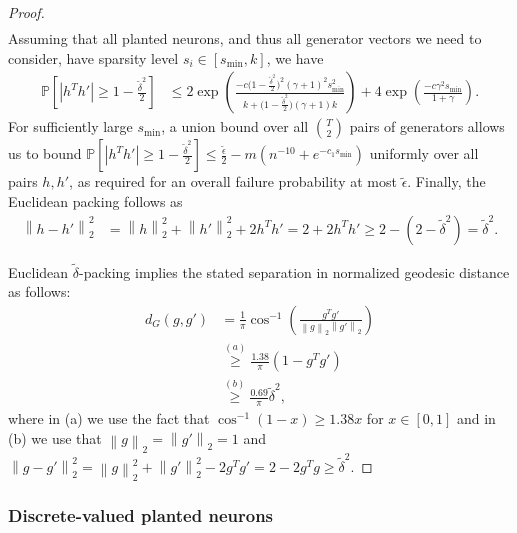 \documentclass{article} %
\newcommand{\twonorm}[1]{\left\|#1\right\|_{2}}
\newcommand{\Prob}{\ensuremath{{\mathbb{P}}}}
\newcommand{\1}{\ensuremath{{\sf (i)}}}
\newcommand{\2}{\ensuremath{{\sf (ii)}}}
\newcommand{\3}{\ensuremath{{\sf (iii)}}}
\newcommand{\4}{\ensuremath{{\sf (iv)}}}
\newcommand{\5}{\ensuremath{{\sf (v)}}}
\newcommand{\6}{\ensuremath{{\sf (vi)}}}
\begin{document}
\begin{proof}
\begin{align*}
\end{align*}
Assuming that all planted neurons, and thus all generator vectors we need to consider, have sparsity level $s_i \in [s_{\text{min}}, k]$, we have
\begin{align*}
    \Prob\left[|h^Th'| \geq 1-\frac{\tilde\delta^2}{2}\right] 
    &\leq 2\exp\left(\frac{-c \big(1-\frac{\tilde\delta^2}{2}\big)^2(\gamma+1)^2s_{\text{min}}^2}{k +\big(1-\frac{\tilde\delta^2}{2}\big)(\gamma+1)k} \right) 
    + 4\exp\left(\frac{-c\gamma^2s_{\text{min}}}{1+\gamma} \right)  .
\end{align*}
For sufficiently large $s_{\min{}}$, a union bound over all ${T \choose 2}$ pairs of generators allows us to bound $\Prob\left[|h^Th'| \geq 1-\frac{\tilde\delta^2}{2}\right] \leq \frac{\tilde\epsilon}{2} - m(n^{-10} + e^{-c_1s_\text{min}})$ uniformly over all pairs $h, h'$, as required for an overall failure probability at most $\tilde \epsilon$.
Finally, the Euclidean packing follows as
\begin{align*}
    \twonorm{h - h'}^2 &= \twonorm{h}^2 + \twonorm{h'}^2 + 2h^Th' = 2 + 2h^Th' \geq 2 - (2-\tilde\delta^2) = \tilde\delta^2 .
\end{align*}



Euclidean $\tilde\delta$-packing implies the stated separation in normalized geodesic distance as follows:
\begin{align*}
    d_G(g, g') &= \frac{1}{\pi}\cos^{-1}\left(\frac{g^Tg'}{\twonorm{g}\twonorm{g'}} \right) \\
    &\overset{(a)}{\geq} \frac{1.38}{\pi}(1-g^Tg') \\
    &\overset{(b)}{\geq}  \frac{0.69}{\pi} \tilde\delta^2 ,
\end{align*}
where in (a) we use the fact that $\cos^{-1}(1-x) \geq 1.38x$ for $x \in [0,1]$ and in (b) we use that $\twonorm{g} = \twonorm{g'} = 1$ and $\twonorm{g-g'}^2 = \twonorm{g}^2 + \twonorm{g'}^2 - 2g^Tg' = 2 - 2g^Tg \geq \tilde\delta^2$.
\end{proof}






\subsubsection{Discrete-valued planted neurons}
\end{document}
